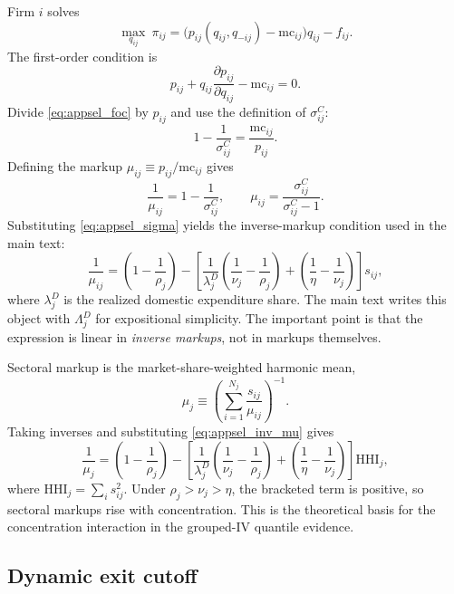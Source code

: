 Firm $i$ solves
\[
\max_{q_{ij}} \ \pi_{ij}
=
\bigl(p_{ij}(q_{ij},q_{-ij})-\text{mc}_{ij}\bigr)q_{ij}-f_{ij}.
\]
The first-order condition is
\begin{equation}
p_{ij}
+ q_{ij}\frac{\partial p_{ij}}{\partial q_{ij}}
- \text{mc}_{ij}
= 0.
\label{eq:appsel_foc}
\end{equation}
Divide \eqref{eq:appsel_foc} by $p_{ij}$ and use the definition of $\sigma_{ij}^C$:
\[
1 - \frac{1}{\sigma_{ij}^C} = \frac{\text{mc}_{ij}}{p_{ij}}.
\]
Defining the markup $\mu_{ij} \equiv p_{ij}/\text{mc}_{ij}$ gives
\begin{equation}
\frac{1}{\mu_{ij}} = 1 - \frac{1}{\sigma_{ij}^C},
\qquad
\mu_{ij} = \frac{\sigma_{ij}^C}{\sigma_{ij}^C-1}.
\label{eq:appsel_mu_sigma}
\end{equation}
Substituting \eqref{eq:appsel_sigma} yields the inverse-markup condition used in the main text:
\begin{equation}
\frac{1}{\mu_{ij}}
=
\left(1-\frac{1}{\rho_j}\right)
-
\left[
\frac{1}{\lambda_j^D}\left(\frac{1}{\nu_j}-\frac{1}{\rho_j}\right)
+
\left(\frac{1}{\eta}-\frac{1}{\nu_j}\right)
\right] s_{ij},
\label{eq:appsel_inv_mu}
\end{equation}
where $\lambda_j^D$ is the realized domestic expenditure share. The main text writes this object with $\Lambda_j^D$ for expositional simplicity. The important point is that the expression is linear in \emph{inverse markups}, not in markups themselves.

Sectoral markup is the market-share-weighted harmonic mean,
\[
\mu_j
\equiv
\left(\sum_{i=1}^{N_j} \frac{s_{ij}}{\mu_{ij}}\right)^{-1}.
\]
Taking inverses and substituting \eqref{eq:appsel_inv_mu} gives
\begin{equation}
\frac{1}{\mu_j}
=
\left(1-\frac{1}{\rho_j}\right)
-
\left[
\frac{1}{\lambda_j^D}\left(\frac{1}{\nu_j}-\frac{1}{\rho_j}\right)
+
\left(\frac{1}{\eta}-\frac{1}{\nu_j}\right)
\right]\text{HHI}_j,
\label{eq:appsel_sector_mu}
\end{equation}
where $\text{HHI}_j = \sum_i s_{ij}^2$. Under $\rho_j > \nu_j > \eta$, the bracketed term is positive, so sectoral markups rise with concentration. This is the theoretical basis for the concentration interaction in the grouped-IV quantile evidence.

\subsection{Dynamic exit cutoff}


